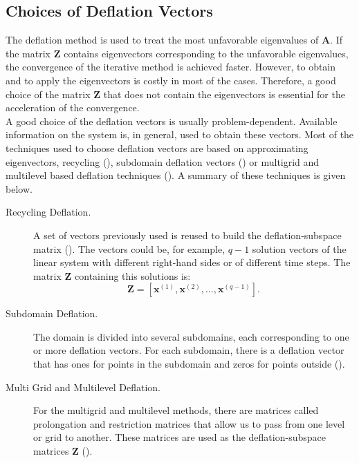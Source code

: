 \documentclass[12pt]{article}
\begin{document}
\subsection{Choices of Deflation Vectors}
\hspace{0.5cm}The deflation method is used to treat the most unfavorable eigenvalues
of $\mathbf{A}$. If the matrix $\mathbf{Z}$ contains eigenvectors corresponding to the unfavorable 
eigenvalues, the convergence of the 
iterative method is achieved faster. However, to obtain and to apply the eigenvectors is costly in most 
of the cases.
Therefore, a good choice of the matrix $\mathbf{Z}$ that does not contain the eigenvectors is essential
for the acceleration of the convergence.\\
A good choice of the deflation vectors is usually problem-dependent. Available information on the system is, in general,
used to obtain these vectors.
Most of the techniques used to choose deflation vectors are based on approximating eigenvectors, 
recycling (\cite{Clemens04}), subdomain deflation vectors (\cite{Vuik02}) or multigrid and 
multilevel based deflation techniques (\cite{Tang09,Smith96}). A summary of these techniques is given below.
\begin{description}
 \item [Recycling Deflation.] A set of vectors previously used is reused to build the deflation-subspace 
 matrix (\cite{Clemens04}). 
The vectors could be, for example, $q-1$
solution vectors of the linear system with different right-hand sides or of different time steps.
The matrix $\mathbf{Z}$ containing this solutions is:
$$\mathbf{Z}=[\mathbf{x}^{(1)},\mathbf{x}^{(2)},...,\mathbf{x}^{(q-1)}].$$
 \item [Subdomain Deflation.] The domain is divided into several subdomains,
 each corresponding to one or more deflation vectors.
For each subdomain, there is a deflation vector that has ones for points in the 
subdomain and zeros for points outside (\cite{Vuik02}).
 \item [Multi Grid and Multilevel Deflation.] For the multigrid and multilevel methods, 
 there are matrices called prolongation and restriction matrices that
allow us to pass from one level or grid to another. 
These matrices are used as the deflation-subspace matrices $\mathbf{Z}$ (\cite{Tang09}).
\end{description}
\end{document}

